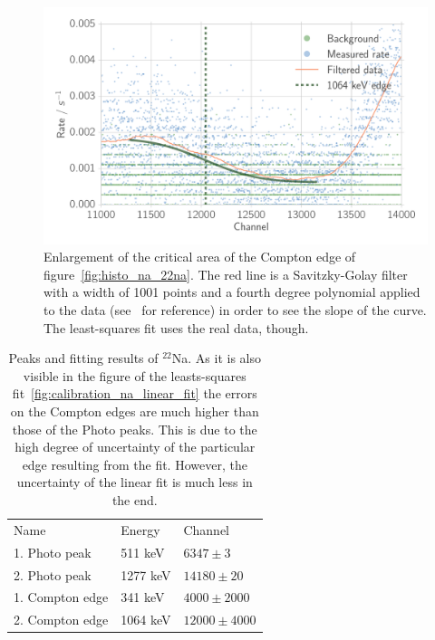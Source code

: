 \begin{figure}[htpb]
    \centering
    \includegraphics[width=0.9\linewidth]{./analysis/figures/histo_na_22na2}
    \caption{Enlargement of the critical area of the Compton edge of
    figure~\ref{fig:histo_na_22na}.     
    The red line is a Savitzky-Golay filter 
    with a width of 1001 points and a fourth
    degree polynomial applied to the data (see~\cite{scipy} for reference) in order
    to see the slope of the curve. The least-squares fit uses the real data, though.
}
\label{fig:histo_na_22na2}
\end{figure}

\begin{table}[htpb]
    \centering
    \caption{Peaks and fitting results of $^{22}$Na. As it is also visible in the figure
    of the leasts-squares fit~\ref{fig:calibration_na_linear_fit} the errors on the
    Compton edges are much higher than those of the Photo peaks. This is due to the high
    degree of uncertainty of the particular edge resulting from the fit. However, the 
    uncertainty of the linear fit is much less in the end.}
\label{tab:peaks_na_ps}
\begin{tabular}{lll}
    \rowcolor{LightCyan} Name &Energy & Channel \\ 
       1. Photo peak& 511 keV & $6347 \pm 3$ \\ 
       2. Photo peak& 1277 keV & $14180 \pm 20 $\\
       1. Compton edge& 341 keV& $4000 \pm 2000$\\
       2. Compton edge& 1064 keV & $12000 \pm 4000$
    \end{tabular}
\end{table}

